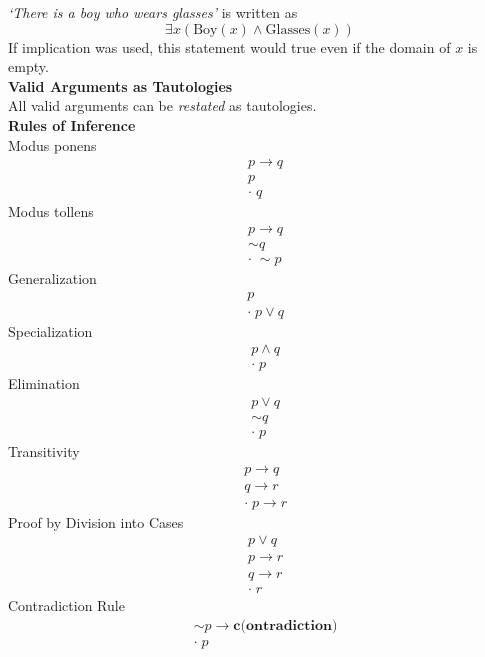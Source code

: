 \documentclass[a4paper]{article}
\newcommand{\subheading}[1]{{\scriptsize\textbf{#1}}}
\begin{document}
\begin{multicols*}{4}
\textit{`There is a boy who wears glasses'} is written as
  $$\exists x (\text{Boy}(x) \land \text{Glasses}(x)) $$
If implication was used, this statement would true even if the domain of $x$ is
empty.\\

\subheading{Valid Arguments as Tautologies}\\
All valid arguments can be \textit{restated} as tautologies.\\

\subheading{Rules of Inference}\\
Modus ponens
\begin{eqnarray*}
  &p \rightarrow q \\
  &p \\
  &\boldsymbol{\cdot}\; q
\end{eqnarray*}
Modus tollens
\begin{eqnarray*}
  &p \rightarrow q \\
  &\sim q \\
  &\boldsymbol{\cdot}\; \sim p
\end{eqnarray*}
Generalization
\begin{eqnarray*}
  &p\\
  &\boldsymbol{\cdot}\; p \lor q
\end{eqnarray*}
Specialization
\begin{eqnarray*}
  &p \land q\\
  &\boldsymbol{\cdot}\; p
\end{eqnarray*}
Elimination
\begin{eqnarray*}
  &p \lor q\\
  &\sim q\\
  &\boldsymbol{\cdot}\; p
\end{eqnarray*}
Transitivity
\begin{eqnarray*}
  &p \rightarrow q\\
  &q \rightarrow r\\
  &\boldsymbol{\cdot}\; p \rightarrow r
\end{eqnarray*}
Proof by Division into Cases
\begin{eqnarray*}
  &p \lor q\\
  &p \rightarrow r\\
  &q \rightarrow r\\
  &\boldsymbol{\cdot}\; r
\end{eqnarray*}
Contradiction Rule
\begin{eqnarray*}
  &\sim p \rightarrow \textbf{c(ontradiction)}\\
  &\boldsymbol{\cdot}\; p
\end{eqnarray*}


\end{multicols*}
\end{document}
